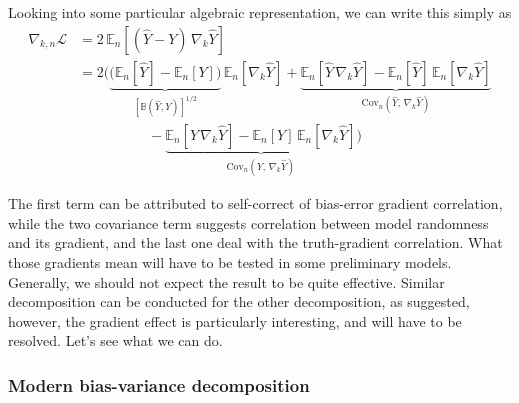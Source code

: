 Looking into some particular algebraic representation, we can write this simply as
\begin{align}
    \nabla_{k,n}\mathcal{L}
    &= 2\,\mathbb{E}_n\!\left[(\hat Y - Y)\,\nabla_k \hat Y\right] \\
    &= 2\Bigg(
    \underset{\left[\mathbb{B}(\hat{Y},Y)\right]^{1/2}}{\underbrace{\bigl(\mathbb{E}_n[\hat Y] - \mathbb{E}_n[Y]\bigr)}}\,\mathbb{E}_n[\nabla_k \hat Y]
    + \underset{\mathrm{Cov}_n(\hat Y,\,\nabla_k \hat Y)}{\underbrace{\mathbb{E}_n[\hat Y\,\nabla_k \hat Y] - \mathbb{E}_n[\hat Y]\,\mathbb{E}_n[\nabla_k \hat Y]}}
     \\
    & \quad \quad \quad \quad \quad -\underset{\mathrm{Cov}_n(Y,\,\nabla_k \hat Y)}{\underbrace{\mathbb{E}_n[Y\,\nabla_k \hat Y] - \mathbb{E}_n[Y]\,\mathbb{E}_n[\nabla_k \hat Y]}}
    \Bigg)
\end{align}

The first term can be attributed to self-correct of bias-error gradient correlation, while the two covariance term suggests correlation between model randomness and its gradient, and the last one deal with the truth-gradient correlation. What those gradients mean will have to be tested in some preliminary models. Generally, we should not expect the result to be quite effective. Similar decomposition can be conducted for the other decomposition, as suggested, however, the gradient effect is particularly interesting, and will have to be resolved. Let's see what we can do. 

\subsubsection{Modern bias-variance decomposition}

